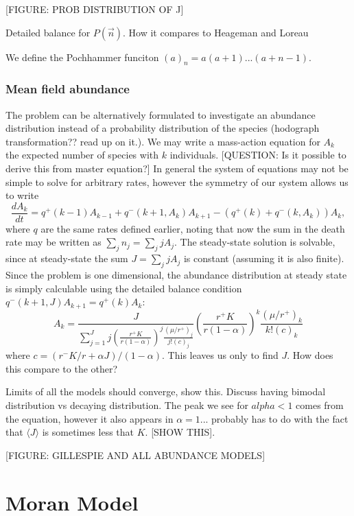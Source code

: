 \documentclass[11pt,a4paper,final]{iopart}
\begin{document}
[FIGURE: PROB DISTRIBUTION OF J]

Detailed balance for $P(\vec{n})$.
How it compares to Heageman and Loreau ~\cite{Haegeman2011}

We define the Pochhammer funciton $(a)_n=a(a+1)...(a+n-1)$.

\subsubsection{Mean field abundance}
The problem can be alternatively formulated to investigate an abundance distribution instead of a probability distribution of the species (hodograph transformation?? read up on it.).
We may write a mass-action equation for $A_k$ the expected number of species with $k$ individuals.
[QUESTION: Is it possible to derive this from master equation?]
In general the system of equations may not be simple to solve for arbitrary rates, however the symmetry of our system allows us to write
\begin{equation}
\frac{dA_k}{dt} = q^+(k-1)A_{k-1} + q^-(k+1,{A_k})A_{k+1} - \left( q^+(k) + q^-(k,{A_k}) \right) A_{k},
\end{equation}
where $q$ are the same rates defined earlier, noting that now the sum in the death rate may be written as $\sum_j n_j = \sum_j j A_j$.
The steady-state solution is solvable, since at steady-state the sum $J=\sum_j j A_j$ is constant (assuming it is also finite).
Since the problem is one dimensional, the abundance distribution at steady state is simply calculable using the detailed balance condition $q^-(k+1,J)A_{k+1}=q^+(k)A_k$:
\begin{equation}
A_k = \frac{J}{\sum_{j=1}^J j \left( \frac{r^+ K}{r(1-\alpha)} \right) ^j \frac{ (\mu /r^+)_{j} }{ j!(c)_{j} }} \left( \frac{r^+ K}{r(1-\alpha)} \right) ^k \frac{ (\mu /r^+)_{k} }{ k!(c)_{k} }
\end{equation}
where $c=(r^-K/r+\alpha J)/(1-\alpha)$. 
This leaves us only to find $J$.
How does this compare to the other?

Limits of all the models should converge, show this. Discuss having bimodal distribution vs decaying distribution. The peak we see for $alpha < 1$ comes from the equation, however it also appears in $\alpha = 1$... probably has to do with the fact that $\langle J \rangle $ is sometimes less that $K$. [SHOW THIS]. 

[FIGURE: GILLESPIE AND ALL ABUNDANCE MODELS]

\section{Moran Model}
\end{document}
